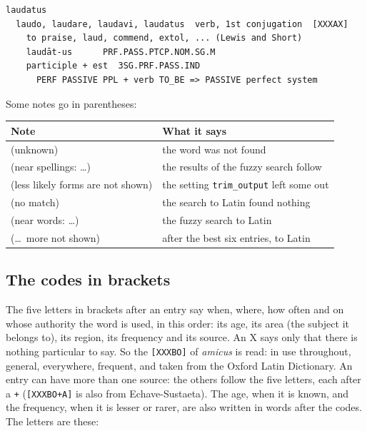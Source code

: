 \documentclass[12pt,
              article,
              oneside
              ]{memoir}
\begin{document}
\begin{verbatim}
laudatus
  laudo, laudare, laudavi, laudatus  verb, 1st conjugation  [XXXAX]
    to praise, laud, commend, extol, ... (Lewis and Short)
    laudāt-us      PRF.PASS.PTCP.NOM.SG.M
    participle + est  3SG.PRF.PASS.IND
      PERF PASSIVE PPL + verb TO_BE => PASSIVE perfect system
\end{verbatim}

\noindent{}%
Some notes go in parentheses:

\begin{longtable}{@{}>{\raggedright}p{}p{}@{}}
\toprule
Note & What it says\\
\midrule
\endhead
(unknown) & the word was not found\\
(near spellings: \ldots) & the results of the fuzzy search follow\\
(less likely forms are not shown) & the setting \texttt{trim\_output} left some out\\
(no match) & the search to Latin found nothing\\
(near words: \ldots) & the fuzzy search to Latin\\
(\ldots\ more not shown) & after the best six entries, to Latin\\
\bottomrule
\end{longtable}

\subsection{The codes in brackets}
\label{sec:codes}

%
The five letters in brackets after an entry say when, where, how often and
on whose authority the word is used, in this order: its age, its area (the
subject it belongs to), its region, its frequency and its source. An X
says only that there is nothing particular to say. So the
\texttt{[XXXBO]} of \textit{amicus} is read: in use throughout, general,
everywhere, frequent, and taken from the Oxford Latin Dictionary. An entry
can have more than one source: the others follow the five letters, each
after a \texttt{+} (\texttt{[XXXBO+A]} is also from Echave-Sustaeta). The
age, when it is known, and the frequency, when it is lesser or rarer, are
also written in words after the codes. The letters are these:
\end{document}
